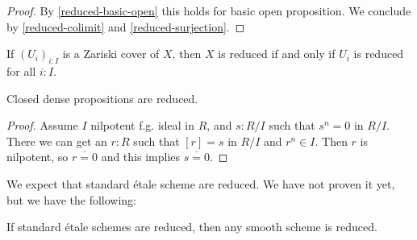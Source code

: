\begin{proof}
By \cref{reduced-basic-open} this holds for basic open proposition. We conclude by \cref{reduced-colimit} and \cref{reduced-surjection}.
\end{proof}

\begin{corollary}
If $(U_i)_{i:I}$ is a Zariski cover of $X$, then $X$ is reduced if and only if $U_i$ is reduced for all $i:I$.
\end{corollary}

\begin{lemma}
Closed dense propositions are reduced.
\end{lemma}

\begin{proof}
Assume $I$ nilpotent f.g. ideal in $R$, and $s:R/I$ such that $s^n = 0$ in $R/I$. There we can get an $r:R$ such that $[r]=s$ in $R/I$ and $r^n \in I$. Then $r$ is nilpotent, so $\overline{r=0}$ and this implies $\overline{s=0}$.
\end{proof}

We expect that standard étale scheme are reduced. We have not proven it yet, but we have the following:

\begin{remark}
If standard étale schemes are reduced, then any smooth scheme is reduced.
\end{remark}

